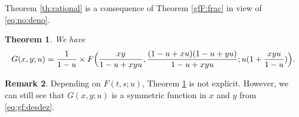 \documentclass[12pt]{amsart} %
\numberwithin{equation}{section}
\theoremstyle{plain}
\newtheorem{theorem}{Theorem}[section]
\theoremstyle{definition}
\newtheorem{remark}[theorem]{Remark}
\begin{document}
Theorem \ref{th:rational} is a consequence of Theorem \ref{gfF:frac} 
in view of \eqref{eq:no:deno}.

\begin{theorem}\label{th:gf:desdez}
	We have
	\begin{equation}\label{eq:gf:desdez}
G(x,y;u)= \frac{1}{1-u} \times F\Bigl(
		\frac{xy}{1-u+xyu}, 
		\frac{(1-u+xu) (1-u+yu)}{1-u+xyu};
		u(1+\frac{xyu}{1-u})\Bigr).
	\end{equation}
\end{theorem}
\begin{remark} Depending on $F(t,s;u)$, Theorem \ref{th:gf:desdez} is not explicit. However, we can still see that $G(x,y;u)$ is a symmetric function in $x$ and $y$ from \eqref{eq:gf:desdez}. 
\end{remark}
\end{document}
